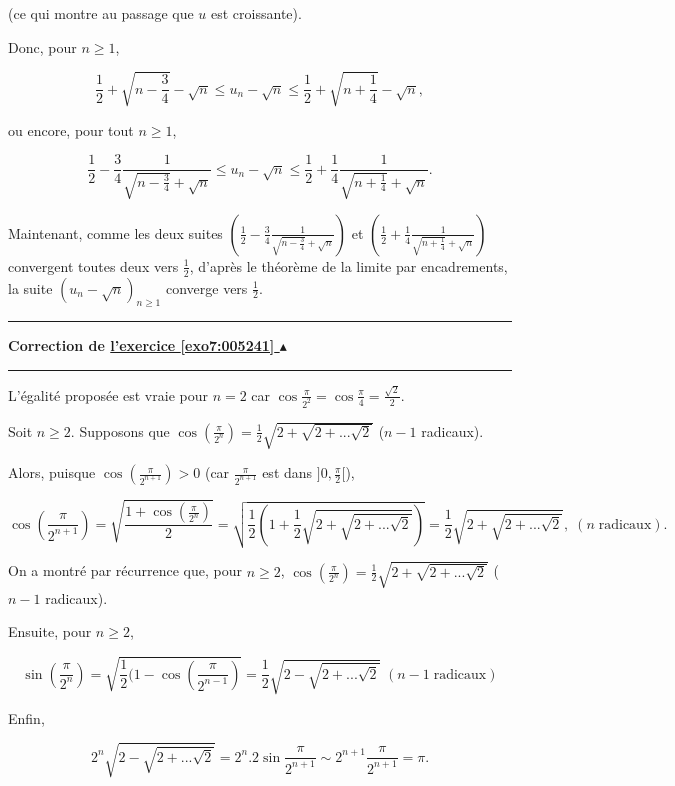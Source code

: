 \documentclass[11pt,a4paper]{article}
\newcounter{exo}
\newcommand{\correction}[1]{\hypertarget{cor7:#1}{}\label{cor7:#1}{\bf Correction de \hyperlink{exo7:#1}{l'exercice \ref{exo7:#1} $\blacktriangle$}}\vspace{1mm}\hrule\vspace{1mm}}
\newcommand{\fincorrection}{\vspace{1mm}\hrule\vspace*{7mm}}
\begin{document}
(ce qui montre au passage que $u$ est croissante).

Donc, pour $n\geq1$,

$$\frac{1}{2}+\sqrt{n-\frac{3}{4}}-\sqrt{n}\leq u_n-\sqrt{n}\leq\frac{1}{2}+\sqrt{n+\frac{1}{4}}-\sqrt{n},$$

ou encore, pour tout $n\geq1$,
 
$$\frac{1}{2}-\frac{3}{4}\frac{1}{\sqrt{n-\frac{3}{4}}+\sqrt{n}}\leq u_n-\sqrt{n}\leq\frac{1}{2}+\frac{1}{4}\frac{1}{\sqrt{n+\frac{1}{4}}+\sqrt{n}}.$$

Maintenant, comme les deux suites 
$(\frac{1}{2}-\frac{3}{4}\frac{1}{\sqrt{n-\frac{3}{4}}+\sqrt{n}})$ et $(\frac{1}{2}+\frac{1}{4}\frac{1}{\sqrt{n+\frac{1}{4}}+\sqrt{n}})$ convergent toutes deux vers $\frac{1}{2}$, d'après le théorème de la limite par encadrements, la suite $(u_n-\sqrt{n})_{n\geq1}$ converge vers $\frac{1}{2}$.
\fincorrection
\correction{005241}
L'égalité proposée est vraie pour $n=2$ car $\cos\frac{\pi}{2^2}=\cos\frac{\pi}{4}=\frac{\sqrt{2}}{2}$.

Soit $n\geq2$. Supposons que $\cos(\frac{\pi}{2^{n}})=\frac{1}{2}\sqrt{2+\sqrt{2+...\sqrt{2}}}$ ($n-1$ radicaux).

Alors, puisque $\cos(\frac{\pi}{2^{n+1}})>0$ (car $\frac{\pi}{2^{n+1}}$ est dans $]0,\frac{\pi}{2}[$), 

$$\cos(\frac{\pi}{2^{n+1}})=\sqrt{\frac{1+\cos(\frac{\pi}{2^{n}})}{2}}=\sqrt{\frac{1}{2}(1+\frac{1}{2}\sqrt{2+\sqrt{2+...\sqrt{2}}})}=\frac{1}{2}\sqrt{2+\sqrt{2+...\sqrt{2}}},\;(n\;\mbox{radicaux}).$$

On a montré par récurrence que, pour $n\geq2$, $\cos(\frac{\pi}{2^{n}})=\frac{1}{2}\sqrt{2+\sqrt{2+...\sqrt{2}}}$ ($n-1$ radicaux).
 
Ensuite, pour $n\geq2$, 

$$\sin(\frac{\pi}{2^{n}})=\sqrt{\frac{1}{2}(1-\cos(\frac{\pi}{2^{n-1}})}=\frac{1}{2}\sqrt{2-\sqrt{2+...\sqrt{2}}}\;(n-1\;\mbox{radicaux})$$

Enfin, 

$$2^n\sqrt{2-\sqrt{2+...\sqrt{2}}}=2^n.2\sin\frac{\pi}{2^{n+1}}\sim2^{n+1}\frac{\pi}{2^{n+1}}=\pi.$$
\end{document}
